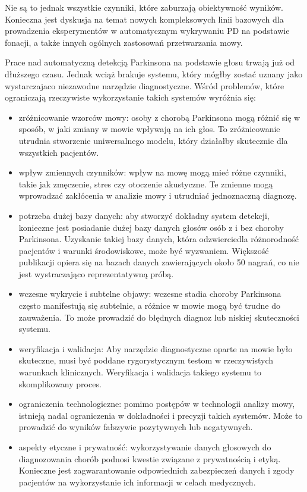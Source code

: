 Nie są to jednak wszystkie czynniki, które zaburzają obiektywność wyników. Konieczna jest dyskusja na temat nowych
kompleksowych linii bazowych dla prowadzenia eksperymentów w automatycznym wykrywaniu PD na podstawie fonacji,
a także innych ogólnych zastosowań przetwarzania mowy.

Prace nad automatyczną detekcją Parkinsona na podstawie głosu trwają już od dłuższego czasu.
Jednak wciąż brakuje systemu, który mógłby zostać uznany jako wystarczajaco niezawodne narzędzie diagnostyczne.
Wśród problemów, które ograniczają rzeczywiste wykorzystanie takich systemów wyróżnia się:
\begin{itemize}[itemsep=0.1pt]
	\item zróżnicowanie wzorców mowy: osoby z chorobą Parkinsona mogą różnić się w sposób, w jaki zmiany w mowie wpływają na ich głos.
To zróżnicowanie utrudnia stworzenie uniwersalnego modelu, który działałby skutecznie dla wszystkich pacjentów.
	\item wpływ zmiennych czynników: wpływ na mowę mogą mieć różne czynniki, takie jak zmęczenie, stres czy otoczenie akustyczne.
Te zmienne mogą wprowadzać zakłócenia w analizie mowy i utrudniać jednoznaczną diagnozę.
	\item potrzeba dużej bazy danych: aby stworzyć dokładny system detekcji, konieczne jest posiadanie dużej bazy danych głosów osób z i
bez choroby Parkinsona. Uzyskanie takiej bazy danych, która odzwierciedla różnorodność pacjentów i warunki środowiskowe, może być wyzwaniem.
Większość publikacji opiera się na bazach danych zawierających około 50 nagrań, co nie jest wystraczająco reprezentatywną próbą.
	\item wczesne wykrycie i subtelne objawy: wczesne stadia choroby Parkinsona często manifestują się subtelnie, a różnice w mowie mogą być
trudne do zauważenia. To może prowadzić do błędnych diagnoz lub niskiej skuteczności systemu.
	\item weryfikacja i walidacja: Aby narzędzie diagnostyczne oparte na mowie było skuteczne, musi być poddane rygorystycznym testom w rzeczywistych
warunkach klinicznych. Weryfikacja i walidacja takiego systemu to skomplikowany proces.
	\item ograniczenia technologiczne: pomimo postępów w technologii analizy mowy, istnieją nadal ograniczenia w dokładności i precyzji takich systemów.
Może to prowadzić do wyników fałszywie pozytywnych lub negatywnych.
	\item aspekty etyczne i prywatność: wykorzystywanie danych głosowych do diagnozowania chorób podnosi kwestie związane z prywatnością i etyką.
Konieczne jest zagwarantowanie odpowiednich zabezpieczeń danych i zgody pacjentów na wykorzystanie ich informacji w celach medycznych.
\end{itemize}

